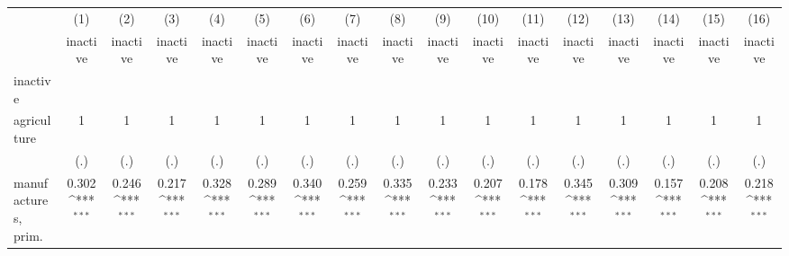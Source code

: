 {
\def\sym#1{\ifmmode^{#1}\else\(^{#1}\)\fi}
\begin{tabular}{l*{16}{c}}
\hline\hline
                    &\multicolumn{1}{c}{(1)}&\multicolumn{1}{c}{(2)}&\multicolumn{1}{c}{(3)}&\multicolumn{1}{c}{(4)}&\multicolumn{1}{c}{(5)}&\multicolumn{1}{c}{(6)}&\multicolumn{1}{c}{(7)}&\multicolumn{1}{c}{(8)}&\multicolumn{1}{c}{(9)}&\multicolumn{1}{c}{(10)}&\multicolumn{1}{c}{(11)}&\multicolumn{1}{c}{(12)}&\multicolumn{1}{c}{(13)}&\multicolumn{1}{c}{(14)}&\multicolumn{1}{c}{(15)}&\multicolumn{1}{c}{(16)}\\
                    &\multicolumn{1}{c}{inactive}&\multicolumn{1}{c}{inactive}&\multicolumn{1}{c}{inactive}&\multicolumn{1}{c}{inactive}&\multicolumn{1}{c}{inactive}&\multicolumn{1}{c}{inactive}&\multicolumn{1}{c}{inactive}&\multicolumn{1}{c}{inactive}&\multicolumn{1}{c}{inactive}&\multicolumn{1}{c}{inactive}&\multicolumn{1}{c}{inactive}&\multicolumn{1}{c}{inactive}&\multicolumn{1}{c}{inactive}&\multicolumn{1}{c}{inactive}&\multicolumn{1}{c}{inactive}&\multicolumn{1}{c}{inactive}\\
\hline
inactive            &                     &                     &                     &                     &                     &                     &                     &                     &                     &                     &                     &                     &                     &                     &                     &                     \\
agriculture         &           1         &           1         &           1         &           1         &           1         &           1         &           1         &           1         &           1         &           1         &           1         &           1         &           1         &           1         &           1         &           1         \\
                    &         (.)         &         (.)         &         (.)         &         (.)         &         (.)         &         (.)         &         (.)         &         (.)         &         (.)         &         (.)         &         (.)         &         (.)         &         (.)         &         (.)         &         (.)         &         (.)         \\
[1em]
manufactures, prim. &       0.302\sym{***}&       0.246\sym{***}&       0.217\sym{***}&       0.328\sym{***}&       0.289\sym{***}&       0.340\sym{***}&       0.259\sym{***}&       0.335\sym{***}&       0.233\sym{***}&       0.207\sym{***}&       0.178\sym{***}&       0.345\sym{***}&       0.309\sym{***}&       0.157\sym{***}&       0.208\sym{***}&       0.218\sym{***}\\

\end{tabular}}
